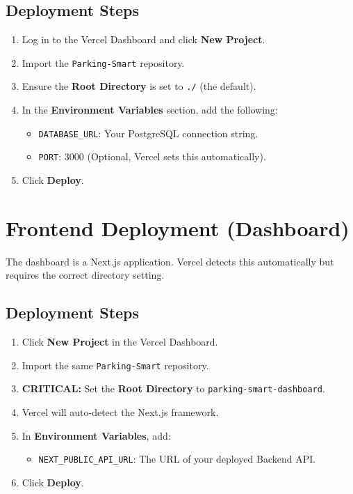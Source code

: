 \documentclass[12pt,a4paper]{article}
\begin{document}
\subsection{Deployment Steps}
\begin{enumerate}
    \item Log in to the Vercel Dashboard and click \textbf{New Project}.
    \item Import the \texttt{Parking-Smart} repository.
    \item Ensure the \textbf{Root Directory} is set to \texttt{./} (the default).
    \item In the \textbf{Environment Variables} section, add the following:
    \begin{itemize}
        \item \texttt{DATABASE\_URL}: Your PostgreSQL connection string.
        \item \texttt{PORT}: 3000 (Optional, Vercel sets this automatically).
    \end{itemize}
    \item Click \textbf{Deploy}.
\end{enumerate}

\section{Frontend Deployment (Dashboard)}
The dashboard is a Next.js application. Vercel detects this automatically but requires the correct directory setting.

\subsection{Deployment Steps}
\begin{enumerate}
    \item Click \textbf{New Project} in the Vercel Dashboard.
    \item Import the same \texttt{Parking-Smart} repository.
    \item \textbf{CRITICAL:} Set the \textbf{Root Directory} to \texttt{parking-smart-dashboard}.
    \item Vercel will auto-detect the Next.js framework.
    \item In \textbf{Environment Variables}, add:
    \begin{itemize}
        \item \texttt{NEXT\_PUBLIC\_API\_URL}: The URL of your deployed Backend API.
    \end{itemize}
    \item Click \textbf{Deploy}.
\end{enumerate}
\end{document}

